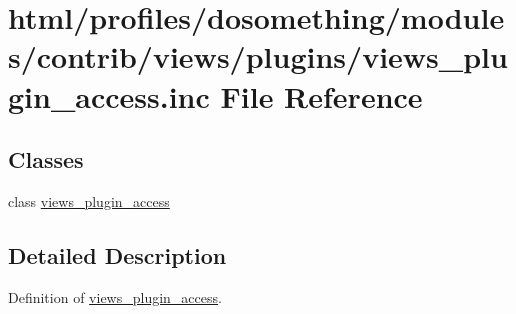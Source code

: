 \hypertarget{views__plugin__access_8inc}{
\section{html/profiles/dosomething/modules/contrib/views/plugins/views\_\-plugin\_\-access.inc File Reference}
\label{views__plugin__access_8inc}
}
\subsection*{Classes}
\begin{DoxyCompactItemize}
\item 
class \hyperlink{classviews__plugin__access}{views\_\-plugin\_\-access}
\end{DoxyCompactItemize}


\subsection{Detailed Description}
Definition of \hyperlink{classviews__plugin__access}{views\_\-plugin\_\-access}. 
